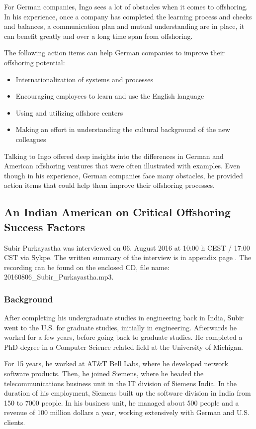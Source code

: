 For German companies, Ingo sees a lot of obstacles when it comes to offshoring. In his experience, once a company has completed the learning process and checks and balances, a communication plan and mutual understanding are in place, it can benefit greatly and over a long time span from offshoring.

The following action items can help German companies to improve their offshoring potential:
\begin{itemize}
	\item Internationalization of systems and processes
	\item Encouraging employees to learn and use the English language
	\item Using and utilizing offshore centers
	\item Making an effort in understanding the cultural background of the new colleagues
\end{itemize}

Talking to Ingo offered deep insights into the differences in German and American offshoring ventures that were often illustrated with examples. Even though in his experience, German companies face many obstacles, he provided action items that could help them improve their offshoring processes.

\subsection{An Indian American on Critical Offshoring Success Factors} 
Subir Purkayastha was interviewed on 06. August 2016 at 10:00 h CEST / 17:00 CST via Sykpe. The written summary of the interview is in appendix page \pageref{int:Subir}. The recording can be found on the enclosed CD, file name: 20160806\_Subir\_Purkayastha.mp3.

\subsubsection{Background}

After completing his undergraduate studies in engineering back in India, Subir went to the U.S. for graduate studies, initially in engineering. Afterwards he worked for a few years, before going back to graduate studies. He completed a PhD-degree in a Computer Science related field at the University of Michigan.

For 15 years, he worked at AT\&T Bell Labs, where he developed network software products. Then, he joined Siemens, where he headed the telecommunications business unit in the IT division of Siemens India. In the duration of his employment, Siemens built up the software division in India from 150 to 7000 people. In his business unit, he managed about 500 people and a revenue of 100 million dollars a year, working extensively with German and U.S. clients.

